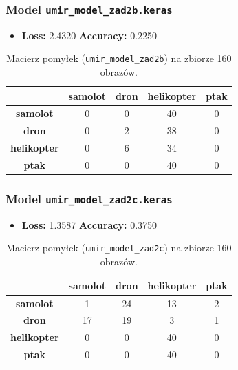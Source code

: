 \noindent



\subsubsection*{Model \texttt{umir\_model\_zad2b.keras}}
\begin{itemize}
    \item \textbf{Loss:} 2.4320 \quad \textbf{Accuracy:} 0.2250 \quad
\end{itemize}

\begin{table}[H]
\centering
\caption{Macierz pomyłek (\texttt{umir\_model\_zad2b}) na zbiorze 160 obrazów.}
\begin{tabular}{c|cccc}
\hline
 & \textbf{samolot} & \textbf{dron} & \textbf{helikopter} & \textbf{ptak}\\
\hline
\textbf{samolot}     & 0 &  0 & 40 &  0 \\
\textbf{dron}        & 0 &  2 & 38 &  0 \\
\textbf{helikopter}  & 0 &  6 & 34 &  0 \\
\textbf{ptak}        & 0 &  0 & 40 &  0 \\
\hline
\end{tabular}
\end{table}

\noindent


\subsubsection*{Model \texttt{umir\_model\_zad2c.keras}}
\begin{itemize}
    \item \textbf{Loss:} 1.3587 \quad \textbf{Accuracy:} 0.3750 \quad 
\end{itemize}

\begin{table}[H]
\centering
\caption{Macierz pomyłek (\texttt{umir\_model\_zad2c}) na zbiorze 160 obrazów.}
\begin{tabular}{c|cccc}
\hline
 & \textbf{samolot} & \textbf{dron} & \textbf{helikopter} & \textbf{ptak}\\
\hline
\textbf{samolot}     &  1 & 24 & 13 &  2 \\
\textbf{dron}        & 17 & 19 &  3 &  1 \\
\textbf{helikopter}  &  0 &  0 & 40 &  0 \\
\textbf{ptak}        &  0 &  0 & 40 &  0 \\
\hline
\end{tabular}
\end{table}

